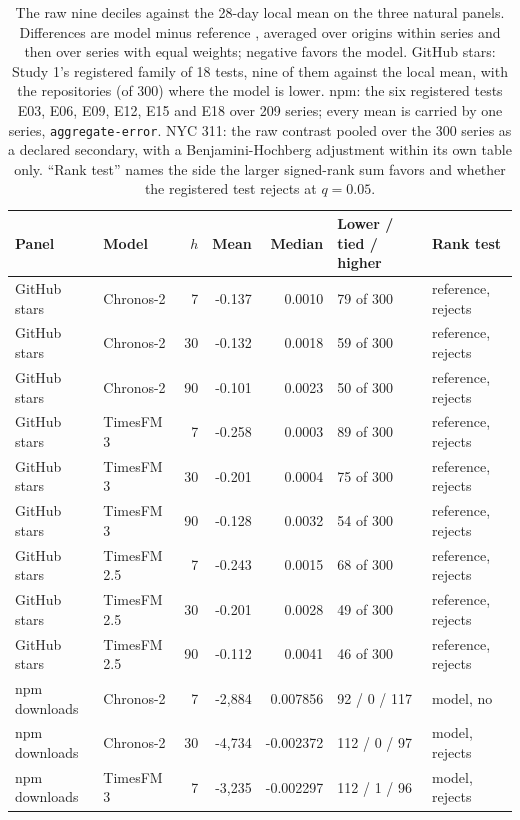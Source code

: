 \begin{table}[t]
\centering\footnotesize\setlength{\tabcolsep}{3.5pt}
\caption{The raw nine deciles against the 28-day local mean on the three natural panels. Differences are
model minus reference \qs{}, averaged over origins within series and then over series with equal weights;
negative favors the model. GitHub stars: Study 1's registered family of 18 tests, nine of them against the
local mean, with the repositories (of 300) where the model is lower. npm: the six registered tests E03, E06,
E09, E12, E15 and E18 over 209 series; every mean is carried by one series, \texttt{aggregate-error}. NYC
311: the raw contrast pooled over the 300 series as a declared secondary, with a Benjamini-Hochberg
adjustment within its own table only. ``Rank test'' names the side the larger signed-rank sum favors and
whether the registered test rejects at $q = 0.05$.}
\label{tab:raw}
\begin{tabular}{llrrrll}
\toprule
Panel & Model & $h$ & Mean & Median & Lower / tied / higher & Rank test \\
\midrule
GitHub stars & Chronos-2 & 7 & -0.137 & 0.0010 & 79 of 300 & reference, rejects \\
GitHub stars & Chronos-2 & 30 & -0.132 & 0.0018 & 59 of 300 & reference, rejects \\
GitHub stars & Chronos-2 & 90 & -0.101 & 0.0023 & 50 of 300 & reference, rejects \\
GitHub stars & TimesFM 3 & 7 & -0.258 & 0.0003 & 89 of 300 & reference, rejects \\
GitHub stars & TimesFM 3 & 30 & -0.201 & 0.0004 & 75 of 300 & reference, rejects \\
GitHub stars & TimesFM 3 & 90 & -0.128 & 0.0032 & 54 of 300 & reference, rejects \\
GitHub stars & TimesFM 2.5 & 7 & -0.243 & 0.0015 & 68 of 300 & reference, rejects \\
GitHub stars & TimesFM 2.5 & 30 & -0.201 & 0.0028 & 49 of 300 & reference, rejects \\
GitHub stars & TimesFM 2.5 & 90 & -0.112 & 0.0041 & 46 of 300 & reference, rejects \\
\midrule
npm downloads & Chronos-2 & 7 & -2,884 & 0.007856 & 92 / 0 / 117 & model, no \\
npm downloads & Chronos-2 & 30 & -4,734 & -0.002372 & 112 / 0 / 97 & model, rejects \\
npm downloads & TimesFM 3 & 7 & -3,235 & -0.002297 & 112 / 1 / 96 & model, rejects \\

\end{tabular}
\end{table}
